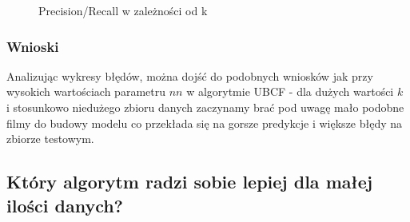 \documentclass[12pt, a4paper]{article}
\begin{document}
\begin{figure}[H]
  \begin{center}
  \end{center}
  \caption{Precision/Recall w zależności od k}
  \label{fig:ubcf-nn-rmse}
\end{figure}



\subsubsection{Wnioski}
Analizując wykresy błędów, można dojść do podobnych wniosków jak przy wysokich wartościach parametru $nn$ w algorytmie UBCF - dla dużych wartości $k$ i stosunkowo niedużego zbioru danych zaczynamy brać pod uwagę mało podobne filmy do budowy modelu co przekłada się na gorsze predykcje i większe błędy na zbiorze testowym.


\subsection{Który algorytm radzi sobie lepiej dla małej ilości danych?}
\end{document}

